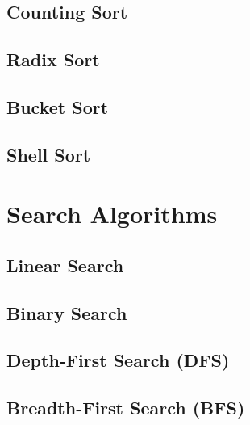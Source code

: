\documentclass[11pt]{article}
\begin{document}
        \subsection{Counting Sort}
            

        \subsection{Radix Sort}
            

        \subsection{Bucket Sort}
            

        \subsection{Shell Sort}





\section{Search Algorithms}


        \subsection{Linear Search}
        \subsection{Binary Search}
        \subsection{Depth-First Search (DFS)}
        \subsection{Breadth-First Search (BFS)}


        \subsection{}
        \subsection{}
\end{document}
